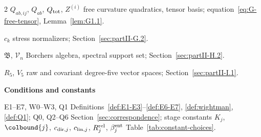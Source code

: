 \begin{multicols}{2}
$Q_{ab,ij}$, $Q_{ab}$, $Q_{\rm tot}$, $Z^{(i)}$ free curvature quadratics, tensor basis; equation~\eqref{eq:G-free-tensor}, Lemma~\ref{lem:G1.1}.

$c_k$ stress normalizers; Section~\ref{sec:partII-G.2}.

$\mathfrak B$, $\mathcal V_n$ Borchers algebra, spectral support set; Section~\ref{sec:partII-H.2}.

$R_5$, $V_5$ raw and covariant degree-five vector spaces; Section~\ref{sec:partII-I.1}.

\medskip\textbf{Conditions and constants}\par
E1--E7, W0--W3, Q1 Definitions~\ref{def:E1-E3}--\ref{def:E6-E7}, \ref{def:wightman}, \ref{def:Q1}; Q0, Q2--Q6 Section~\ref{sec:correspondence}; stage constants $K_j$, $\colbound{j}$, $c_{{\rm dir},j}$, $c_{{\rm lin},j}$, $R^{\rm rel}_j$, $\beta^{\rm ent}_j$ Table~\ref{tab:constant-choices}.
\end{multicols}
